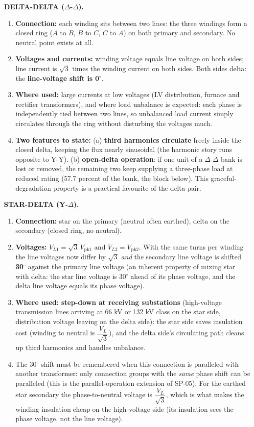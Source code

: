 \documentclass[11pt]{article}
\newcommand{\tagline}[1]{\textbf{\color{copper}#1}}
\begin{document}
\tagline{DELTA-DELTA ($\Delta$-$\Delta$).}
\begin{enumerate}[label=\arabic*.]
\item \textbf{Connection:} each winding sits between two lines: the three windings form a closed ring ($A$ to $B$, $B$ to $C$, $C$ to $A$) on both primary and secondary. No neutral point exists at all.
\item \textbf{Voltages and currents:} winding voltage equals line voltage on both sides; line current is $\sqrt{3}$ times the winding current on both sides. Both sides delta: the \textbf{line-voltage shift is 0$^\circ$}.
\item \textbf{Where used:} large currents at low voltages (LV distribution, furnace and rectifier transformers), and where load unbalance is expected: each phase is independently tied between two lines, so unbalanced load current simply circulates through the ring without disturbing the voltages much.
\item \textbf{Two features to state:} (a) \textbf{third harmonics circulate} freely inside the closed delta, keeping the flux nearly sinusoidal (the harmonic story runs opposite to Y-Y). (b) \textbf{open-delta operation}: if one unit of a $\Delta$-$\Delta$ bank is lost or removed, the remaining two keep supplying a three-phase load at reduced rating (57.7 percent of the bank, the block below). This graceful-degradation property is a practical favourite of the delta pair.
\end{enumerate}

\tagline{STAR-DELTA (Y-$\Delta$).}
\begin{enumerate}[label=\arabic*.]
\item \textbf{Connection:} star on the primary (neutral often earthed), delta on the secondary (closed ring, no neutral).
\item \textbf{Voltages:} $V_{L1} = \sqrt{3}\,V_{\text{ph1}}$ and $V_{L2} = V_{\text{ph2}}$. With the same turns per winding the line voltages now differ by $\sqrt{3}$ \emph{and} the secondary line voltage is shifted \textbf{30$^\circ$} against the primary line voltage (an inherent property of mixing star with delta: the star line voltage is 30$^\circ$ ahead of its phase voltage, and the delta line voltage equals its phase voltage).
\item \textbf{Where used:} \textbf{step-down at receiving substations} (high-voltage transmission lines arriving at 66 kV or 132 kV class on the star side, distribution voltage leaving on the delta side): the star side saves insulation cost (winding to neutral is $\dfrac{V_L}{\sqrt{3}}$), and the delta side's circulating path cleans up third harmonics and handles unbalance.
\item The 30$^\circ$ shift must be remembered when this connection is paralleled with another transformer: only connection groups with the \emph{same} phase shift can be paralleled (this is the parallel-operation extension of SP-05). For the earthed star secondary the phase-to-neutral voltage is $\dfrac{V_L}{\sqrt{3}}$, which is what makes the winding insulation cheap on the high-voltage side (its insulation sees the phase voltage, not the line voltage).
\end{enumerate}
\end{document}
